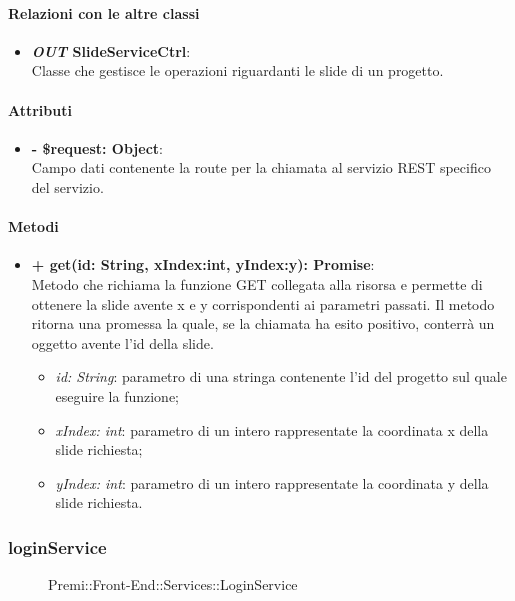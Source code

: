 	\paragraph{Relazioni con le altre classi}
	\begin{itemize}
		\item \textbf{\textit{OUT} SlideServiceCtrl}:\\
			Classe che gestisce le operazioni riguardanti le slide di un progetto.
	\end{itemize}
	
	\paragraph{Attributi}
	\begin{itemize}
		\item \textbf{- \$request: Object}:\\
			Campo dati contenente la route per la chiamata al servizio REST specifico del servizio.
	\end{itemize}	
	
	\paragraph{Metodi}
	\begin{itemize}
		\item \textbf{+ get(id: String, xIndex:int, yIndex:y): Promise}:\\
			Metodo che richiama la funzione GET collegata alla risorsa e permette di ottenere la slide avente x e y corrispondenti ai parametri passati. Il metodo ritorna una promessa la quale, se la chiamata ha esito positivo, conterrà un oggetto avente l'id della slide.\\
		\begin{itemize}
			\item \textit{id: String}: parametro di una stringa contenente l'id del progetto sul quale eseguire la funzione;
			\item \textit{xIndex: int}: parametro di un intero rappresentate la coordinata x della slide richiesta;
			\item \textit{yIndex: int}: parametro di un intero rappresentate la coordinata y della slide richiesta.
		\end{itemize}
	\end{itemize}


\subsubsection{loginService}
	\begin{figure}[h]
		\centering
		\caption[Premi::Front-End::Services::LoginService]{Premi::Front-End::Services::LoginService}
	\end{figure}

